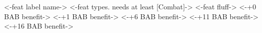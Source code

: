  { <-feat label name-> }
\combatfea
{ <-feat types. needs at least [Combat]-> }
{ <-feat fluff-> }
{ <-+0 BAB benefit-> }
{ <-+1 BAB benefit-> }
{ <-+6 BAB benefit-> }
{ <-+11 BAB benefit-> }
{ <-+16 BAB benefit-> }